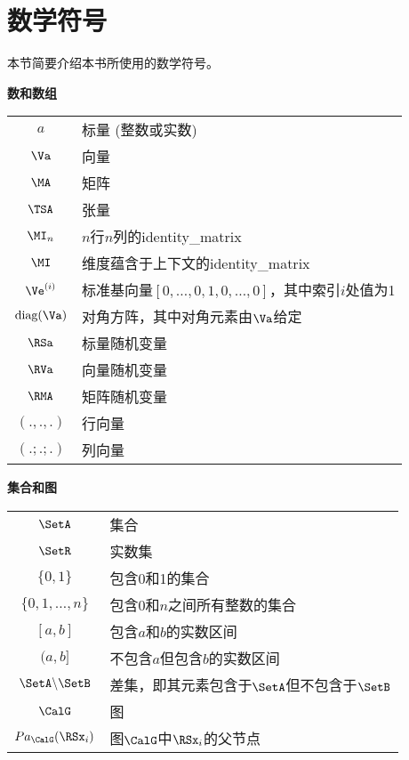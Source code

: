\chapter*{数学符号}
\label{notation}



本节简要介绍本书所使用的数学符号。 

\vspace{\notationgap}
\begin{minipage}{\textwidth}
\centerline{\bf 数和数组}
\bgroup
\def\arraystretch{1.5}
\begin{tabular}{cp{3.25in}}
$\displaystyle a$ & 标量 (整数或实数) \\
$\displaystyle \Va$ & 向量 \\
$\displaystyle \MA$ & 矩阵 \\
$\displaystyle \TSA$ & 张量 \\
$\displaystyle \MI_n$ & $n$行$n$列的\gls{identity_matrix} \\
$\displaystyle \MI$ &  维度蕴含于上下文的\gls{identity_matrix} \\
$\displaystyle \Ve^{(i)}$ & 标准基向量$[0,\dots,0,1,0,\dots,0]$，其中索引$i$处值为1 \\ 
$\displaystyle \text{diag}(\Va)$ & 对角方阵，其中对角元素由$\Va$给定 \\
$\displaystyle \RSa$ & 标量随机变量 \\
$\displaystyle \RVa$ & 向量随机变量 \\
$\displaystyle \RMA$ & 矩阵随机变量 \\
$\displaystyle (.,.,.)$ & 行向量 \\
$\displaystyle (.;.;.)$ & 列向量 \\
\end{tabular}
\egroup
\end{minipage}

\vspace{\notationgap}
\begin{minipage}{\textwidth}
\centerline{\bf 集合和图}
\bgroup
\def\arraystretch{1.5}
\begin{tabular}{cp{3.25in}}
$\displaystyle \SetA$ & 集合 \\
$\displaystyle \SetR$ & 实数集 \\
$\displaystyle \{0, 1\}$ & 包含0和1的集合 \\
$\displaystyle \{0, 1, \dots, n \}$ & 包含$0$和$n$之间所有整数的集合 \\
$\displaystyle [a, b]$ & 包含$a$和$b$的实数区间 \\
$\displaystyle (a, b]$ & 不包含$a$但包含$b$的实数区间 \\
$\displaystyle \SetA \backslash \SetB$ & 差集，即其元素包含于$\SetA$但不包含于$\SetB$\\
$\displaystyle \CalG$ & 图 \\
$\displaystyle Pa_\CalG(\RSx_i)$ & 图$\CalG$中$\RSx_i$的父节点
\end{tabular}
\egroup
\end{minipage}

